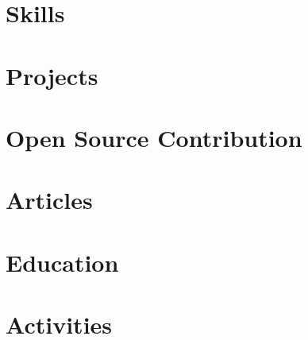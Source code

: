 \documentclass[letter, 11pt]{article}
\begin{document}


\section{Skills}


\section{Projects}


\section{Open Source Contribution}


\section{Articles}
% 

\section{Education}
% 

\section{Activities}
% 
\end{document}
